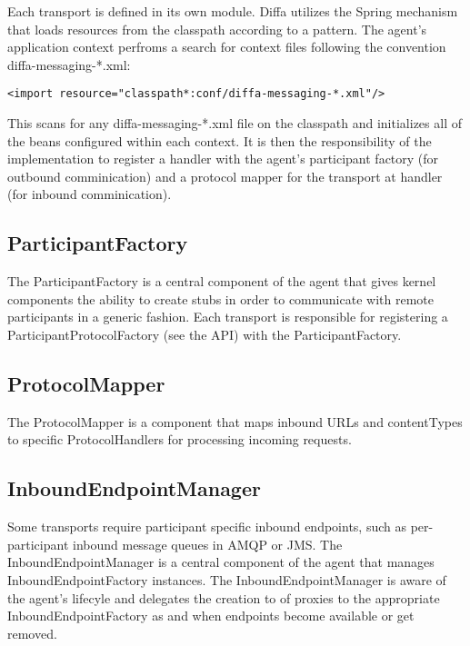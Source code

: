 Each transport is defined in its own module. Diffa utilizes the Spring mechanism that loads resources from the classpath according to a pattern. The agent's application context perfroms a search for context files following the convention diffa-messaging-*.xml:

\begin{lstlisting}
<import resource="classpath*:conf/diffa-messaging-*.xml"/>
\end{lstlisting}

This scans for any diffa-messaging-*.xml file on the classpath and initializes all of the beans configured within each context. It is then the responsibility of the implementation to register a handler with the agent's participant factory (for outbound comminication) and a protocol mapper for the transport at handler (for inbound comminication).

\subsection{ParticipantFactory}

The ParticipantFactory is a central component of the agent that gives kernel components the ability to create stubs in order to communicate with remote participants in a generic fashion. Each transport is responsible for registering a ParticipantProtocolFactory (see the API) with the ParticipantFactory. 

\subsection{ProtocolMapper}

The ProtocolMapper is a component that maps inbound URLs and contentTypes to specific ProtocolHandlers for processing incoming requests.

\subsection{InboundEndpointManager}

Some transports require participant specific inbound endpoints, such as per-participant inbound message queues in AMQP or JMS. The InboundEndpointManager is a central component of the agent that manages InboundEndpointFactory instances. The InboundEndpointManager is aware of the agent's lifecyle and delegates the creation to of proxies to the appropriate InboundEndpointFactory as and when endpoints become available or get removed.


